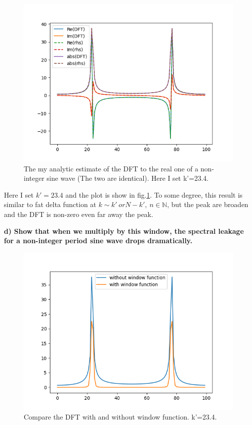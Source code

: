 \documentclass[showpacs, oneside, onecolumn, prl, amsmath, amssymb, nofootinbib, superscriptaddress, notitlepage]{revtex4-1}
\newcommand\bfig{\begin{figure}}
\newcommand\efig{\end{figure}}
\begin{document}
\bfig
	\centering
	\includegraphics[scale=0.85]{4-5-3.png}
	\caption{The my analytic estimate of the DFT to the real one of a non-integer sine wave (The two are identical). Here I set k'=23.4.}
	\label{4-5-3}
\efig

Here I set $k'=23.4$ and the plot is show in fig.\ref{4-5-3}. To some degree, this result is similar to fat delta function at $k\sim k'\ or N-k',\ n\in \mathbb N$, but the peak are broaden and the DFT is non-zero even far away the peak.

\textbf{d) Show that when we multiply by this window, the spectral leakage for a non-integer period sine wave drops dramatically.}

\bfig
	\centering
	\includegraphics[scale=0.85]{4-5-4.png}
	\caption{Compare the DFT with and without window function. k'=23.4.}
	\label{4-5-4}
\efig
\end{document}
